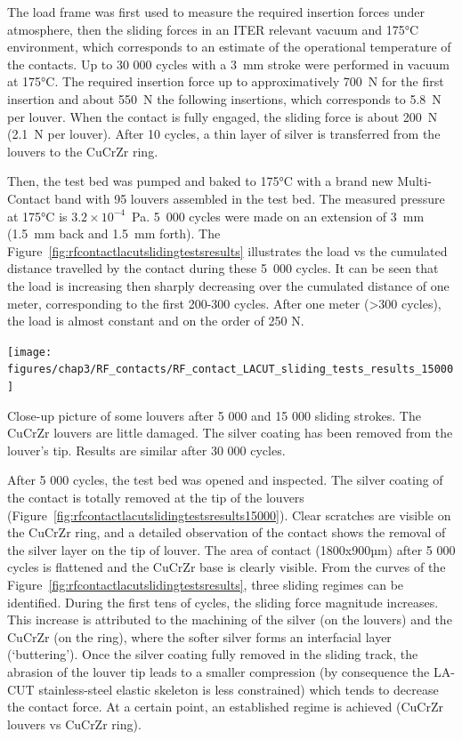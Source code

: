 {The load frame was first used to measure the required insertion forces under atmosphere, then the sliding forces in an ITER relevant vacuum and 175$\si{\degreeCelsius}$ environment, which corresponds to an estimate of the operational temperature of the contacts. Up to 30 000 cycles with a 3~mm stroke were performed in vacuum at 175$\si{\degreeCelsius}$. The required insertion force up to approximatively 700~N for the first insertion and about 550~N the following insertions, which corresponds to 5.8~N per louver. When the contact is fully engaged, the sliding force is about 200~N (2.1~N per louver). After 10 cycles, a thin layer of silver is transferred from the louvers to the CuCrZr ring. 

Then, the test bed was pumped and baked to 175$\si{\degreeCelsius}$ with a brand new Multi-Contact band with 95 louvers assembled in the test bed. The measured pressure at 175$\si{\degreeCelsius}$ is $3.2\times 10^{-4}$~Pa. 5~000 cycles were made on an extension of 3~mm (1.5~mm back and 1.5~mm forth). The Figure~\ref{fig:rfcontactlacutslidingtestsresults} illustrates the load vs the cumulated distance travelled by the contact during these 5~000 cycles. It can be seen that the load is increasing then sharply decreasing over the cumulated distance of one meter, corresponding to the first 200-300 cycles. After one meter (>300 cycles), the load is almost constant and on the order of 250 N.


\begin{marginfigure}
	\centering
	\texttt{[image: figures/chap3/RF\_contacts/RF\_contact\_LACUT\_sliding\_tests\_results\_15000]}
	\caption{Close-up picture of some louvers after 5 000 and 15 000 sliding strokes. The CuCrZr louvers are little damaged. The silver coating has been removed from the louver's tip. Results are similar after 30 000 cycles.}
	\label{fig:rfcontactlacutslidingtestsresults15000}
\end{marginfigure}

After 5 000 cycles, the test bed was opened and inspected. The silver coating of the contact is totally removed at the tip of the louvers (Figure~\ref{fig:rfcontactlacutslidingtestsresults15000}). Clear scratches are visible on the CuCrZr ring, and a detailed observation of the contact shows the removal of the silver layer on the tip of louver. The area of contact (1800x900µm) after 5 000 cycles is flattened and the CuCrZr base is clearly visible. From the curves of the Figure~\ref{fig:rfcontactlacutslidingtestsresults}, three sliding regimes can be identified. During the first tens of cycles, the sliding force magnitude increases. This increase is attributed to the machining of the silver (on the louvers) and the CuCrZr (on the ring), where the softer silver forms an interfacial layer (‘buttering’). Once the silver coating fully removed in the sliding track, the abrasion of the louver tip leads to a smaller compression (by consequence the LA-CUT stainless-steel elastic skeleton is less constrained) which tends to decrease the contact force. At a certain point, an established regime is achieved (CuCrZr louvers vs CuCrZr ring).  

}
